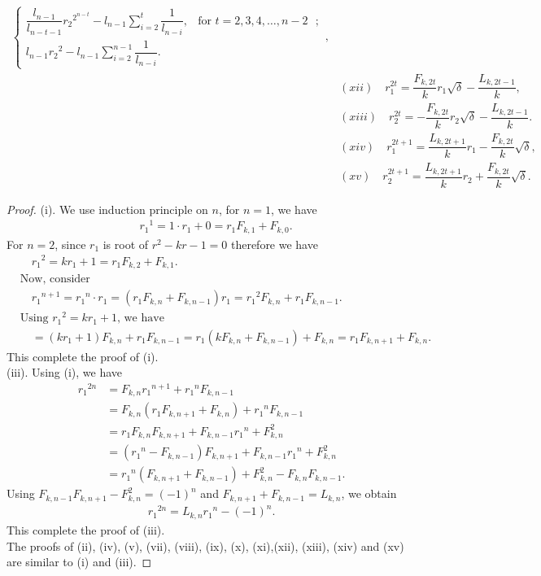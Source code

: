 \begin{lemma}
\begin{align*}
\begin{cases}
\dfrac{l_{n-1}}{l_{n-t-1}}{r_2}^{2^{n-t}}-l_{n-1}\sum\limits_{i=2}^{t}\dfrac{1}{l_{n-i}}, & \text{for $t=2, 3, 4,\hdots, n-2 $ };\\l_{n-1}{r_2}^2-l_{n-1}\sum\limits_{i=2}^{n-1}\dfrac{1}{l_{n-i}}.
 \end{cases},\\
 &(xii)\quad r_1^{2t}=\dfrac{{F}_{k,2t}}{k}r_1\sqrt{\delta}-\dfrac{{L}_{k,2t-1}}{k},\\
&(xiii)\quad r_2^{2t}=-\dfrac{{F}_{k,2t}}{k}r_2\sqrt{\delta}-\dfrac{{L}_{k,2t-1}}{k}.\\
&(xiv)\quad r_1^{2t+1}=\dfrac{{L}_{k,2t+1}}{k}r_1-\dfrac{{F}_{k,2t}}{k}\sqrt{\delta},\\
&(xv)\quad r_2^{2t+1}=\dfrac{{L}_{k,2t+1}}{k}r_2+\dfrac{{F}_{k,2t}}{k}\sqrt{\delta}.
\end{align*} 
\end{lemma}
\begin{proof}
(i). We use induction principle on $n$, for $n=1$, we have
\begin{align*}
&{r_1}^1=1\cdot r_1+0=r_1 {F}_{k,1}+{F}_{k,0}.
\end{align*}
For $n=2$, since $r_1$ is root of $r^2-kr-1=0$ therefore we have
\begin{align*}
&\quad {r_1}^2=kr_1+1=r_1 {F}_{k,2}+{F}_{k,1}.\\
&\text{Now, consider}\\
&\quad {r_1}^{n+1}={r_1}^n\cdot r_1 = (r_1 {F}_{k,n}+{F}_{k,n-1})r_1= {r_1}^2F_{k,n}+r_1F_{k,n-1}.\\
&\text{Using ${r_1}^2=kr_1+1$, we have}\\
&\quad =(kr_1+1)F_{k,n}+r_1F_{k,n-1} = r_1(kF_{k,n}+F_{k,n-1})+F_{k,n} = r_1F_{k,n+1}+F_{k,n}.
\end{align*}
This complete the proof of (i).\\
(iii). Using (i), we have
\begin{align*}
{r_1}^{2n}&={F}_{k,n}{r_1}^{n+1}+{r_1}^n{F}_{k,n-1}\\
&={F}_{k,n}({r_1}{F}_{k,n+1}+{F}_{k,n})+{r_1}^n{F}_{k,n-1}\\
&={r_1}{F}_{k,n}{F}_{k,n+1}+{F}_{k,n-1}{r_1}^n+{F}_{k,n}^2\\
&=({r_1}^n-{F}_{k,n-1}){F}_{k,n+1}+{F}_{k,n-1}{r_1}^n+{F}_{k,n}^2\\
&={r_1}^n({F}_{k,n+1}+{F}_{k,n-1})+{F}_{k,n}^2-{F}_{k,n}F_{k,n-1}.
\end{align*}
Using ${F}_{k,n-1}{F}_{k,n+1}-{F}_{k,n}^2=(-1)^n$ and ${F}_{k,n+1}+{F}_{k,n-1}={L}_{k,n}$, we obtain
\begin{align*}
{r_1}^{2n}={L}_{k,n}{r_1}^n-(-1)^n.
\end{align*}
This complete the proof of (iii).\\
The proofs of (ii), (iv), (v), (vii), (viii), (ix), (x), (xi),(xii), (xiii), (xiv) and (xv) are similar to (i) and (iii).
\end{proof}
